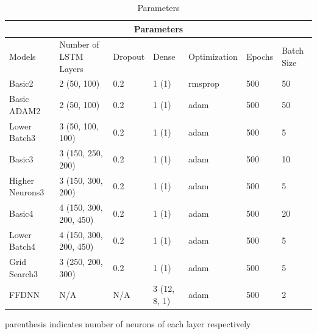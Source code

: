 \documentclass[10pt,11pt,12pt,oneside]{book}
\begin{document}
\begin{table}[H]
\centering
\begin{threeparttable}
\begin{tabular}{ |p{2cm}||p{2.5cm}|p{1.5cm}|p{1.5cm}| p{2.5cm} | p{1.5cm}| p{1.5cm} |   }
 \hline
 \multicolumn{7}{|c|}{Parameters} \\
 \hline
Models & Number of LSTM Layers & Dropout & Dense & Optimization & Epochs & Batch Size\\
 \hline
 Basic2 & 2 (50, 100) & 0.2 & 1 (1) & rmsprop & 500 & 50\\
 \hline
 Basic ADAM2 & 2 (50, 100) & 0.2 & 1 (1) & adam & 500 & 50\\
 \hline
 Lower Batch3 & 3 (50, 100, 100) & 0.2 & 1 (1) & adam & 500 & 5\\
 \hline
 Basic3 & 3 (150, 250, 200) & 0.2 & 1 (1) & adam & 500 & 10\\
 \hline
Higher Neurons3 & 3 (150, 300, 200) & 0.2 & 1 (1) & adam & 500 & 5\\
 \hline
 Basic4 & 4 (150, 300, 200, 450) & 0.2 & 1 (1) & adam & 500 & 20\\
 \hline
 Lower Batch4 & 4 (150, 300, 200, 450) & 0.2 & 1 (1) & adam & 500 & 5\\
 \hline
 Grid Search3 & 3 (250, 200, 300) & 0.2 & 1 (1) & adam & 500 & 5\\
  \hline
 FFDNN & N/A & N/A & 3 (12, 8, 1) & adam & 500 & 2\\
 \hline
\end{tabular}
\begin{tablenotes}
      \small
      \item parenthesis indicates number of neurons of each layer respectively
    \end{tablenotes}
\end{threeparttable}
\caption{Parameters}
\label{table:params}
\end{table}
\end{document}
